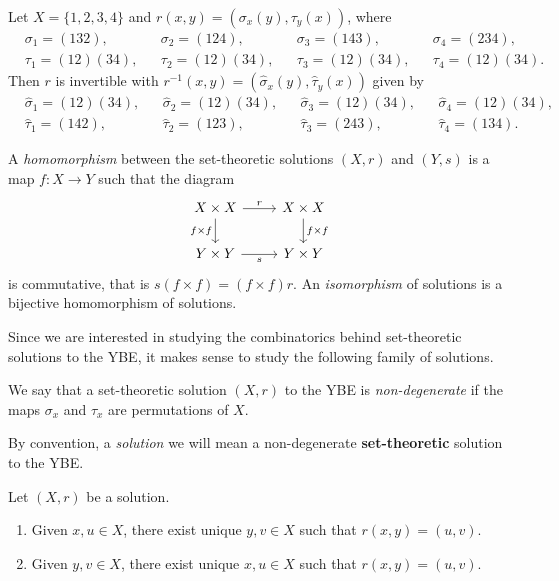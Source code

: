 \begin{example}
Let $X=\{1,2,3,4\}$ and $r(x,y)=(\sigma_x(y),\tau_y(x))$, where
\begin{align*}
&\sigma_1=(132),&&
\sigma_2=(124),&&
\sigma_3=(143),&&
\sigma_4=(234),\\
&\tau_1=(12)(34),&&
\tau_2=(12)(34),&&
\tau_3=(12)(34),&&
\tau_4=(12)(34).
\end{align*}
Then $r$ is invertible with $r^{-1}(x,y)=(\widehat{\sigma}_x(y),\widehat{\tau}_y(x))$ given by
\begin{align*}
&\widehat{\sigma}_1=(12)(34), &&
\widehat{\sigma}_2=(12)(34), &&
\widehat{\sigma}_3=(12)(34), &&
\widehat{\sigma}_4=(12)(34),\\
&\widehat{\tau}_1=(142),&&
\widehat{\tau}_2=(123),&&
\widehat{\tau}_3=(243),&&
\widehat{\tau}_4=(134).
\end{align*}
\end{example}

\begin{definition}
A \emph{homomorphism} between the set-theoretic solutions $(X,r)$ and
$(Y,s)$ is a map $f\colon X\to Y$ such that the diagram 
\[\begin{tikzcd}
	{X\times X} & {X\times X} \\
	{Y\times Y} & {Y\times Y}
	\arrow["r", from=1-1, to=1-2]
	\arrow["{f\times f}"', from=1-1, to=2-1]
	\arrow["{f\times f}", from=1-2, to=2-2]
	\arrow["s"', from=2-1, to=2-2]
\end{tikzcd}
\]
is commutative, that is $s (f\times f)=(f\times f) r$. An \emph{isomorphism} of solutions is a bijective
homomorphism of solutions.
\end{definition}

Since we are interested in studying the combinatorics behind set-theoretic solutions to the YBE,
it makes sense to study the following family of solutions. 

\begin{definition}
We say that a set-theoretic solution $(X,r)$ to the YBE 
is \emph{non-degenerate} if the maps $\sigma_x$ and $\tau_x$ are 
permutations of $X$. 
\end{definition}

By convention, a \emph{solution} we will mean a non-degenerate {\bf set-theoretic} solution to the YBE.

\begin{lemma}
\label{lem:LYZ}
Let $(X,r)$ be a solution. 
\begin{enumerate}
    \item Given $x,u\in X$, there exist unique $y,v\in X$ such that $r(x,y)=(u,v)$. 
    \item Given $y,v\in X$, there exist unique $x,u\in X$ such that $r(x,y)=(u,v)$. 
\end{enumerate}
\end{lemma}


